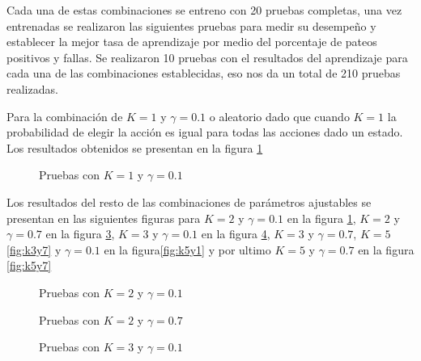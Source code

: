 Cada una de estas combinaciones se entreno con 20 pruebas completas, una vez entrenadas se realizaron las siguientes pruebas para medir su desempeño y establecer la mejor tasa de aprendizaje por medio del porcentaje de pateos positivos y fallas. Se realizaron 10 pruebas con el resultados del aprendizaje para cada una de las combinaciones establecidas, eso nos da un total de 210 pruebas realizadas. 

Para la combinaci\'on de $K = 1$ y $ \gamma = 0.1 $ o aleatorio dado que cuando $K = 1$ la probabilidad de elegir la acci\'on es igual para todas las acciones dado un estado. Los resultados obtenidos se presentan en la figura  \ref{fig:k1y1}

\begin{figure}
\caption{Pruebas con  $K = 1$ y $ \gamma = 0.1 $}
\label{fig:k1y1}
\end{figure} 

Los resultados del resto de las combinaciones de par\'ametros ajustables se presentan en las siguientes figuras para $K = 2$ y $ \gamma = 0.1 $ en la figura \ref{fig:k1y1}, $K = 2$ y $ \gamma = 0.7 $ en la figura \ref{fig:k2y7}, $K = 3$ y $ \gamma = 0.1 $ en la figura \ref{fig:k3y1}, $K = 3$ y $ \gamma = 0.7 $, $K = 5$ \ref{fig:k3y7} y $ \gamma = 0.1 $ en la figura\ref{fig:k5y1} y por ultimo $K = 5$ y $ \gamma = 0.7 $ en la figura \ref{fig:k5y7}

\begin{figure}[h]
\caption{Pruebas con $K = 2$ y $ \gamma = 0.1 $}
\label{fig:k2y1}
\end{figure} 

\begin{figure}[h]
\caption{Pruebas  con $K = 2$ y $ \gamma = 0.7 $}
\label{fig:k2y7}
\end{figure} 

\begin{figure}[h]
\caption{Pruebas con $K = 3$ y $ \gamma = 0.1 $}
\label{fig:k3y1}
\end{figure} 

